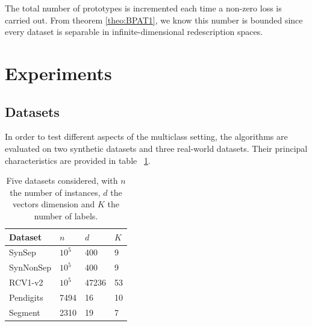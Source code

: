 \documentclass[preprint,12pt,authoryear]{elsarticle}
\begin{document}
The total number of prototypes is incremented each time a non-zero loss is carried out. From theorem \ref{theo:BPAT1}, we know this number is bounded since every dataset is separable in infinite-dimensional redescription spaces. 

  



\section{Experiments}
\subsection{Datasets}
\label{subsec:BPAE}

In order to test different aspects of the multiclass setting, the algorithms are evaluated on two synthetic datasets and three real-world datasets.  Their principal characteristics are provided in table ~\ref{table:mce}.

\begin{table}[h]
	\caption{Five datasets considered, with $n$ the number of instances, $d$ the vectors dimension and $K$ the number of labels.}
	\label{table:mce}
	\begin{center}
		\begin{tabular}{l l l l}
			{\bf Dataset}  & {\bf $n$} & {\bf $d$} & {\bf $K$}\\
			\hline
			SynSep & $10^5$ 	& 400 	& 9 \\
			
			SynNonSep & $10^5$ & 400 	& 9 \\
			
			RCV1-v2  & $10^5$ 	& 47236 	& 53 \\
			
			Pendigits 	& 7494	& 16	& 10	\\
			
			Segment & 2310	& 19	& 7	\\
		\end{tabular}
	\end{center}
\end{table}
\end{document}
